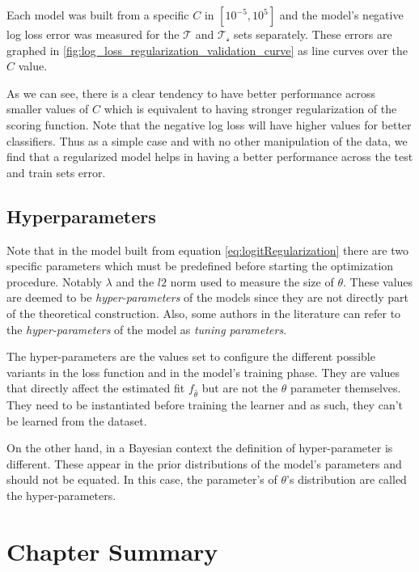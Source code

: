 Each model was built from a specific $C$ in  $[10^{-5},10^5]$  and the model's negative log loss error was measured for the $\mathcal{T}$ and $\mathcal{T_s}$ sets separately. These errors are graphed in \cref{fig:log_loss_regularization_validation_curve} as line curves over the $C$ value.

As we can see, there is a clear tendency to have better performance across smaller values of $C$ which is equivalent to having stronger regularization of the scoring function. Note that the negative log loss will have higher values for better classifiers. Thus as a simple case and with no other manipulation of the data, we find that a regularized model helps in having a better performance across the test and train sets error.


\subsection{Hyperparameters}


Note that in the model built from equation \cref{eq:logitRegularization} there are two specific parameters which must be predefined before starting the optimization procedure. Notably $\lambda$ and the $l2$ norm used to measure the size of $\theta$. These values are deemed to be \textit{hyper-parameters} of the models since they are not directly part of the theoretical construction. Also, some authors in the literature can refer to the \textit{hyper-parameters} of the model as \textit{tuning parameters}.

The hyper-parameters are the values set to configure the different possible variants in the loss function and in the model's training phase. They are values that directly affect the estimated fit $f_{\hat{\theta}}$ but are not the $\theta$ parameter themselves. They need to be instantiated before training the learner and as such, they can't be learned from the dataset.

On the other hand, in a Bayesian context the definition of hyper-parameter is different. These appear in the prior distributions of the model's parameters and should not be equated. In this case, the parameter's of $\theta$'s distribution are called the hyper-parameters.




\section{Chapter Summary}\label{section-ch_machine_learning_summary}

